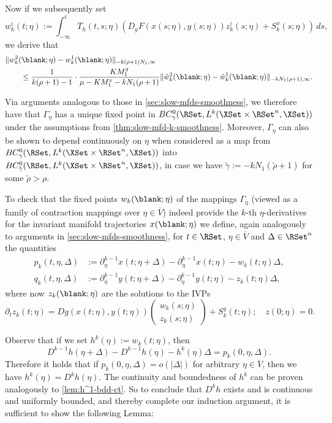\documentclass[a4paper]{siamart190516}
\begin{document}
Now if we subsequently set
\[
w^i_k(t; \eta) := \int^t_{-\infty} T_h(t,s; \eta) \left( D_yF(x(s;\eta),y(s;\eta)) z^i_k(s; \eta) + S^x_{k}(s; \eta) \right) \, ds,
\]
we derive that
\begin{align*}
&\| w_k^2(\blank; \eta) - w_k^1(\blank; \eta)\|_{-k(\rho+1)N_1,\infty} \\ 
&\qquad \leq \frac{1}{k(\rho+1)-1} \cdot \frac{KM^y_1}{\mu - KM^x_1 - k N_1(\rho+1)} \| \tilde{w}_k^2(\blank; \eta) - \tilde{w}_k^1(\blank; \eta)\|_{-k N_1 (\rho+1),\infty}.
\end{align*}

Via arguments analogous to those in \cref{sec:slow-mfds-smoothness}, we therefore
have that $\Gamma_{\eta}$ has a unique fixed point in $BC^0_{\gamma}(\RSet, L^k(\XSet
\times \RSet^n, \XSet))$ under the assumptions from \cref{thm:slow-mfd-k-smoothness}.
Moreover, $\Gamma_{\eta}$ can also be shown to
depend continuously on $\eta$ when considered as a map from $BC^0_{\gamma}(\RSet,
L^k(\XSet \times \RSet^n, \XSet))$ into  $BC^0_{\tilde{\gamma}}(\RSet, L^k(\XSet
\times \RSet^n, \XSet))$, in case we have $\tilde{\gamma} := -k N_1 (\tilde{\rho} +
1)$ for some $\tilde{\rho} > \rho$. 


To check that the fixed points $w_k(\blank; \eta)$ of the mappings $\Gamma_{\eta}$
(viewed as a family of contraction mappings over $\eta \in \overline{V}$) indeed
provide the $k$-th $\eta$-derivatives for the invariant manifold trajectories $x(\blank;
\eta)$ we define, again analogously to arguments in \cref{sec:slow-mfds-smoothness},
for $t \in \RSet$, $\eta \in \overline{V}$ and $\Delta \in \RSet^n$ the quantities
\begin{align*}
  p_k(t,\eta,\Delta) &:= \partial^{k-1} _{\eta}x(t; \eta+\Delta) - \partial^{k-1} _{\eta} x(t; \eta) - w_k(t;\eta) \Delta, \\
  q_k(t,\eta,\Delta) &:= \partial^{k-1} _{\eta} y(t;\eta+\Delta) - \partial^{k-1} _{\eta} y(t; \eta) - z_k(t; \eta) \Delta,
\end{align*}
where now  $z_k(\blank; \eta)$ are the solutions to the IVPs
 \[
 \partial_t z_k(t; \eta) = D g(x(t;\eta), y(t;\eta)) \begin{pmatrix} w_k(s; \eta) \\ z_k(s; \eta)  \end{pmatrix}   + S^y_{k}(t; \eta); \quad z(0; \eta) = 0.
 \]
 
 Observe that if we set $h^k(\eta) := w_k(t; \eta)$, then 
 \[
 D^{k-1}h(\eta+\Delta) - D^{k-1}h(\eta) - h^k(\eta) \Delta = p_k(0, \eta, \Delta).
 \]
 Therefore it holds that if $p_k(0,\eta,\Delta) = o(|\Delta|)$ for arbitrary $\eta
 \in \overline{V}$, then we have $h^k(\eta) = D^k h(\eta)$. The continuity and
 boundedness of $h^k$ can be proven analogously to \cref{lem:h^1-bdd-ct}. So to conclude that $D^k h$ exists and is continuous and uniformly bounded, and thereby complete our induction argument, it is sufficient to show the following Lemma:
 
\end{document}
